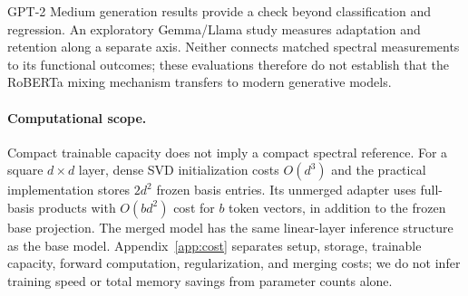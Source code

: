 GPT-2 Medium generation results provide a check beyond classification and regression. An exploratory Gemma/Llama study measures adaptation and retention along a separate axis. Neither connects matched spectral measurements to its functional outcomes; these evaluations therefore do not establish that the RoBERTa mixing mechanism transfers to modern generative models.

\paragraph{Computational scope.}
Compact trainable capacity does not imply a compact spectral reference. For a square $d\times d$ layer, dense SVD initialization costs $O(d^3)$ and the practical implementation stores $2d^2$ frozen basis entries. Its unmerged adapter uses full-basis products with $O(bd^2)$ cost for $b$ token vectors, in addition to the frozen base projection. The merged model has the same linear-layer inference structure as the base model. Appendix~\ref{app:cost} separates setup, storage, trainable capacity, forward computation, regularization, and merging costs; we do not infer training speed or total memory savings from parameter counts alone.
